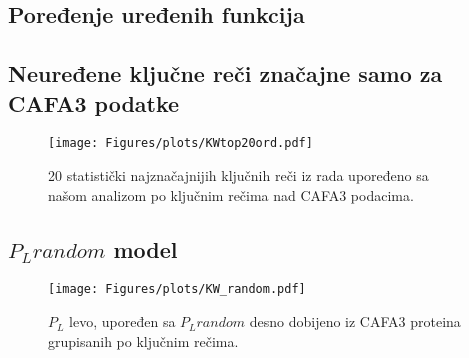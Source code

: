 \subsection{Poređenje uređenih funkcija}




\subsection{ Neuređene ključne reči značajne samo za CAFA3 podatke}



\begin{figure}[th]
\centering
\hspace*{-2.0cm} 
\texttt{[image: Figures/plots/KWtop20ord.pdf]}
\decoRule
\caption {
  20 statistički najznačajnijih  ključnih reči iz rada
  \parencite{Xie2007} upoređeno sa našom analizom po ključnim rečima nad CAFA3 podacima.
}
\label{fig:KWtop20ord}
\end{figure}



\subsection{$P_L random$ model}

\begin{figure}[th]
\centering
\texttt{[image: Figures/plots/KW\_random.pdf]}
\decoRule
\caption {
  $P_L$ levo, upoređen sa $P_L random$ desno dobijeno iz CAFA3 proteina grupisanih po ključnim rečima.
}
\label{fig:KW_random}
\end{figure}
